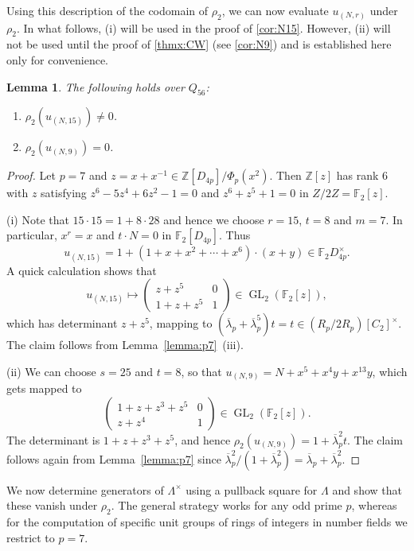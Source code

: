 \documentclass[11pt,leqno,a4paper]{amsart}
\newcommand{\Z}{\mathbb{Z}}
\newcommand{\F}{\mathbb{F}}
\DeclareMathOperator{\GL}{GL}
\newtheorem{lemma}[thm]{Lemma}
\theoremstyle{definition}
\theoremstyle{remark}
\theoremstyle{custom}
\newenvironment{clist}[1]
{\begin{enumerate}[\normalfont #1]}
{\end{enumerate}}
\begin{document}
Using this description of the codomain of $\rho_2$, we can now evaluate $u_{(N, r)}$ under $\rho_2$.
In what follows, (i) will be used in the proof of \cref{cor:N15}. However, (ii) will not be used until the proof of \cref{thmx:CW} (see \cref{cor:N9}) and is established here only for convenience.

\begin{lemma}\label{lemma:rho2u}
The following holds over $Q_{56}$:
\begin{clist}{(i)}
    \item
        $\rho_2(u_{(N, 15)}) \neq 0$.
    \item
        $\rho_2(u_{(N, 9)}) = 0$.
\end{clist}
\end{lemma}

\begin{proof}
    Let $p = 7$ and $z = x + x^{-1} \in \Z[D_{4p}]/\Phi_p(x^2)$. Then $\Z[z]$ has rank $6$ with $z$ satisfying $z^6 - 5z^4 + 6z^2 - 1 = 0$ and $z^6 + z^5 + 1 = 0$ in $Z/2Z = \F_2[z]$.
    
    (i)
    Note that $15 \cdot 15 = 1 + 8 \cdot 28$ and hence we choose $r = 15$, $t = 8$ and $m = 7$.
    In particular, $x^r = x$ and $t \cdot N = 0$ in $\F_2[D_{4p}]$.
    Thus
    \[ u_{(N, 15)} = 1 + (1 + x + x^2 + \dotsb + x^6) \cdot (x + y) \in \F_2D_{4p}^\times.\] 
    A quick calculation shows that
    \[ u_{(N, 15)} \mapsto \begin{pmatrix} z + z^5 & 0 \\ 1 + z + z^5 & 1 \end{pmatrix} \in \GL_2(\F_2[z]), \]
    which has determinant $z + z^5$, mapping to $(\overline \lambda_p + \overline \lambda_p^5) t = t \in (R_p/2R_p)[C_2]^\times$.
    The claim follows from Lemma~\ref{lemma:p7}~(iii).
    
    (ii)  We can choose $s = 25$ and $t = 8$, so that $u_{(N, 9)} = N + x^5 + x^4y + x^{13}y$, which gets mapped to
    \[ \begin{pmatrix} 1 + z + z^3 + z^5 & 0 \\ z + z^4 & 1 \end{pmatrix} \in \GL_2(\F_2[z]). \]
    The determinant is $1 + z + z^3 + z^5$, and hence $\rho_2(u_{(N, 9)}) = 1 + \overline \lambda_p^2 t$. The claim follows again from Lemma~\ref{lemma:p7} since $\overline \lambda_p^2/(1 + \overline \lambda_p^2) = \overline \lambda_p + \overline \lambda_p^2$.
\end{proof}

We now determine generators of $\Lambda^\times$ using a pullback square for $\Lambda$ and show that these vanish under $\rho_2$.
The general strategy works for any odd prime $p$,
whereas for the computation of specific unit groups of rings of integers in number fields we restrict to $p = 7$.
\end{document}

